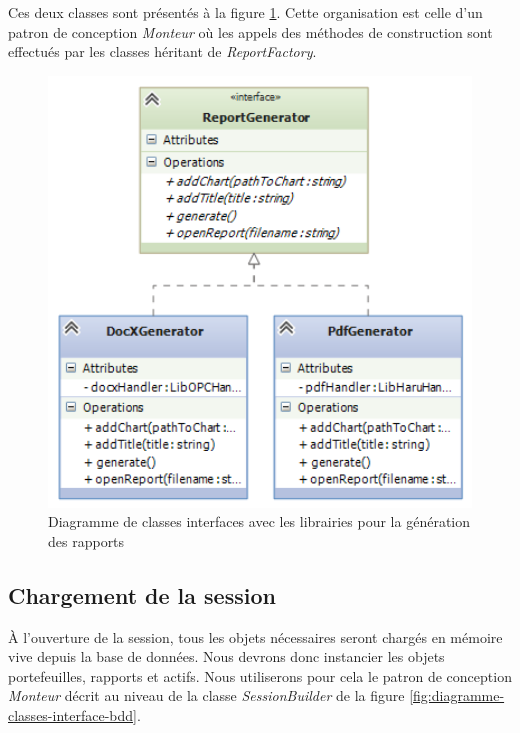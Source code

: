 \documentclass[a4paper,titlepage,french]{report}
\begin{document}
Ces deux classes sont présentés à la figure \ref{fig:diagramme-classes-interface-report}.
Cette organisation est celle d'un patron de conception \textit{Monteur} où les appels des méthodes de construction sont effectués par les classes héritant de \textit{ReportFactory}.

\begin{figure}
  	\center
  	\includegraphics[width=1\textwidth]{diagramme-classes-interface-report.png}
  	\caption{Diagramme de classes interfaces avec les librairies pour la génération des rapports}
  	\label{fig:diagramme-classes-interface-report}
\end{figure}





\subsection{Chargement de la session}

\`A l'ouverture de la session, tous les objets nécessaires seront chargés en mémoire vive depuis la base de données.
Nous devrons donc instancier les objets portefeuilles, rapports et actifs.
Nous utiliserons pour cela le patron de conception \textit{Monteur} décrit au niveau de la classe \textit{SessionBuilder} de la figure \ref{fig:diagramme-classes-interface-bdd}.
\end{document}
